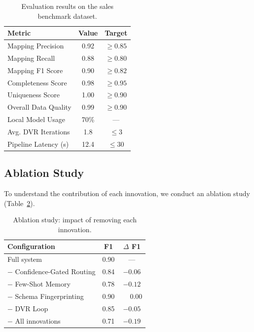\documentclass[conference]{IEEEtran}
\begin{document}
\begin{table}[t]
  \centering
  \caption{Evaluation results on the sales benchmark dataset.}
  \label{tab:results}
  \begin{tabular}{lcc}
    \toprule
    \textbf{Metric} & \textbf{Value} & \textbf{Target} \\
    \midrule
    Mapping Precision     & 0.92 & $\geq 0.85$ \\
    Mapping Recall        & 0.88 & $\geq 0.80$ \\
    Mapping F1 Score      & 0.90 & $\geq 0.82$ \\
    \midrule
    Completeness Score    & 0.98 & $\geq 0.95$ \\
    Uniqueness Score      & 1.00 & $\geq 0.90$ \\
    Overall Data Quality  & 0.99 & $\geq 0.90$ \\
    \midrule
    Local Model Usage     & 70\% & --- \\
    Avg. DVR Iterations   & 1.8  & $\leq 3$ \\
    Pipeline Latency (s)  & 12.4 & $\leq 30$ \\
    \bottomrule
  \end{tabular}
\end{table}

\subsection{Ablation Study}

To understand the contribution of each innovation, we conduct an ablation
study (Table~\ref{tab:ablation}).

\begin{table}[t]
  \centering
  \caption{Ablation study: impact of removing each innovation.}
  \label{tab:ablation}
  \begin{tabular}{lcc}
    \toprule
    \textbf{Configuration} & \textbf{F1} & \textbf{$\Delta$ F1} \\
    \midrule
    Full system                    & 0.90 & ---    \\
    $-$ Confidence-Gated Routing   & 0.84 & $-0.06$ \\
    $-$ Few-Shot Memory            & 0.78 & $-0.12$ \\
    $-$ Schema Fingerprinting      & 0.90 & $\phantom{-}0.00$ \\
    $-$ DVR Loop                   & 0.85 & $-0.05$ \\
    $-$ All innovations            & 0.71 & $-0.19$ \\
    \bottomrule
  \end{tabular}
\end{table}
\end{document}
